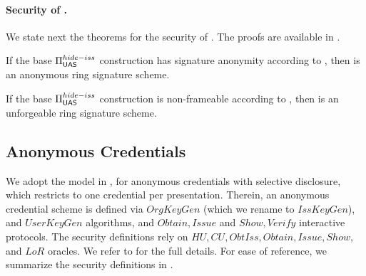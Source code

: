 
\paragraph{Security of \CUASRing.} %
We state next the theorems for the security of \CUASRing. The proofs are
available in .

\begin{theorem}
  If the base $\Pi_{\mathsf{UAS}}^{hide-iss}$ construction has signature anonymity
  according to , then \CUASRing is an anonymous
  ring signature scheme.
\end{theorem}

\begin{theorem}
  If the base $\Pi_{\mathsf{UAS}}^{hide-iss}$ construction is non-frameable according to
  , then \CUASRing is an unforgeable ring signature
  scheme.
\end{theorem}

\subsection{Anonymous Credentials}
\label{ssec:related-models-ac}

We adopt the model in \cite{fhs19}, for anonymous credentials with selective
disclosure, which restricts to one credential per presentation. Therein, an
anonymous credential scheme is defined via $OrgKeyGen$ (which we rename to
$IssKeyGen$), and $UserKeyGen$ algorithms, and $Obtain,
Issue$ and $Show,Verify$ interactive protocols. The security definitions rely on
$HU, CU, ObtIss, Obtain, Issue, Show$, and $LoR$ oracles. We refer to
\cite{fhs19} for the full details. For ease of reference, we summarize the
security definitions in .%

